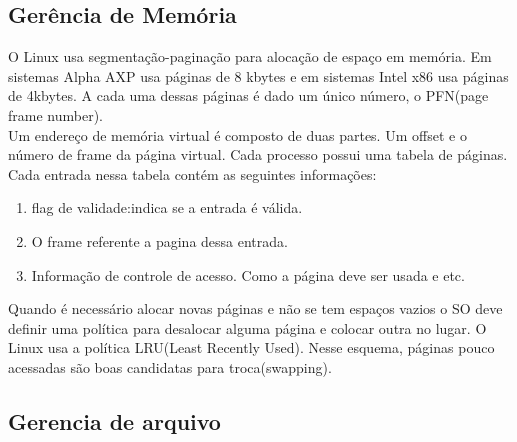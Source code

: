 \documentclass[conference]{IEEEtran}
\begin{document}
\subsection{Gerência de Memória}\label{sec:LinuxMem}
O Linux usa segmentação-paginação para alocação de espaço em memória. Em sistemas Alpha AXP usa páginas de 8 kbytes e em sistemas Intel x86 usa páginas de 4kbytes. A cada uma dessas páginas é dado um único número, o PFN(page frame number)\cite{GerenciaMemLinux}.\\

Um endereço de memória virtual é composto de duas partes. Um offset e o número de frame da página virtual. Cada processo possui uma tabela de páginas. Cada entrada nessa tabela contém as seguintes informações:\\
\begin{enumerate}
	\item flag de validade:indica se a entrada é válida.
	\item O frame referente a pagina dessa entrada.
	\item Informação de controle de acesso. Como a página deve ser usada e etc.
\end{enumerate}
\cite{GerenciaMemLinux}

Quando é necessário alocar novas páginas e não se tem espaços vazios o SO deve definir uma política para desalocar alguma página e colocar outra no lugar. O Linux usa a política LRU(Least Recently Used). Nesse esquema, páginas pouco acessadas são boas candidatas para troca(swapping)\cite{GerenciaIOLinux}.
\subsection{Gerencia de arquivo}\label{sec:BSDArquivo}
\end{document}
